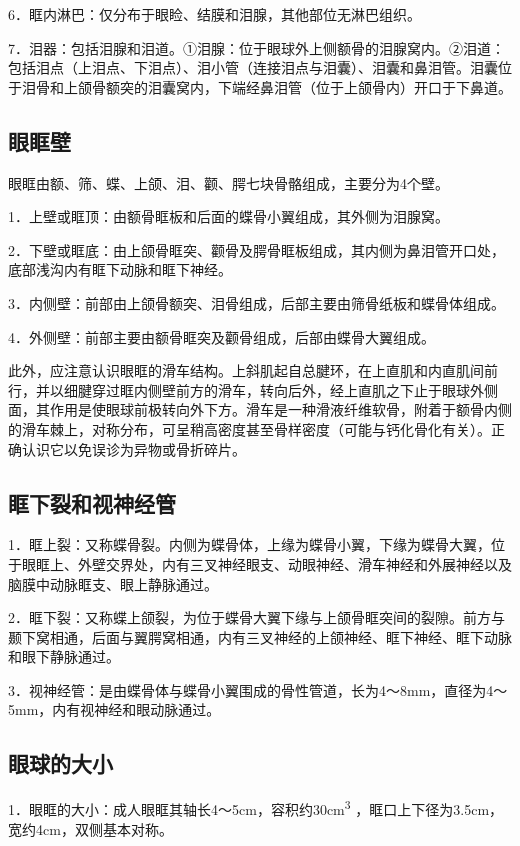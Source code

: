 6．眶内淋巴：仅分布于眼睑、结膜和泪腺，其他部位无淋巴组织。

7．泪器：包括泪腺和泪道。①泪腺：位于眼球外上侧额骨的泪腺窝内。②泪道：包括泪点（上泪点、下泪点）、泪小管（连接泪点与泪囊）、泪囊和鼻泪管。泪囊位于泪骨和上颌骨额突的泪囊窝内，下端经鼻泪管（位于上颌骨内）开口于下鼻道。

\subsection{眼眶壁}

眼眶由额、筛、蝶、上颌、泪、颧、腭七块骨骼组成，主要分为4个壁。

1．上壁或眶顶：由额骨眶板和后面的蝶骨小翼组成，其外侧为泪腺窝。

2．下壁或眶底：由上颌骨眶突、颧骨及腭骨眶板组成，其内侧为鼻泪管开口处，底部浅沟内有眶下动脉和眶下神经。

3．内侧壁：前部由上颌骨额突、泪骨组成，后部主要由筛骨纸板和蝶骨体组成。

4．外侧壁：前部主要由额骨眶突及颧骨组成，后部由蝶骨大翼组成。

此外，应注意认识眼眶的滑车结构。上斜肌起自总腱环，在上直肌和内直肌间前行，并以细腱穿过眶内侧壁前方的滑车，转向后外，经上直肌之下止于眼球外侧面，其作用是使眼球前极转向外下方。滑车是一种滑液纤维软骨，附着于额骨内侧的滑车棘上，对称分布，可呈稍高密度甚至骨样密度（可能与钙化骨化有关）。正确认识它以免误诊为异物或骨折碎片。

\subsection{眶下裂和视神经管}

1．眶上裂：又称蝶骨裂。内侧为蝶骨体，上缘为蝶骨小翼，下缘为蝶骨大翼，位于眼眶上、外壁交界处，内有三叉神经眼支、动眼神经、滑车神经和外展神经以及脑膜中动脉眶支、眼上静脉通过。

2．眶下裂：又称蝶上颌裂，为位于蝶骨大翼下缘与上颌骨眶突间的裂隙。前方与颞下窝相通，后面与翼腭窝相通，内有三叉神经的上颌神经、眶下神经、眶下动脉和眼下静脉通过。

3．视神经管：是由蝶骨体与蝶骨小翼围成的骨性管道，长为4～8mm，直径为4～5mm，内有视神经和眼动脉通过。

\subsection{眼球的大小}

1．眼眶的大小：成人眼眶其轴长4～5cm，容积约30cm\textsuperscript{3}
，眶口上下径为3.5cm，宽约4cm，双侧基本对称。

